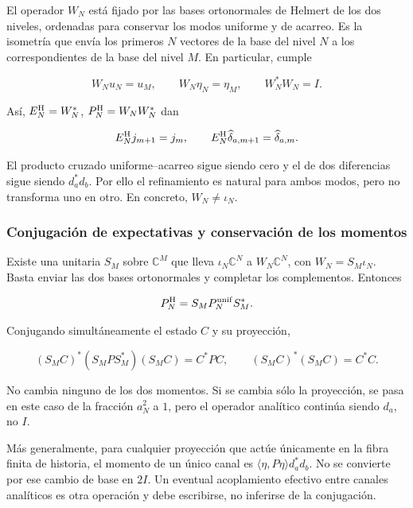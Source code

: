 El operador \(W_N\) está fijado por las bases ortonormales de Helmert
de los dos niveles, ordenadas para conservar los modos uniforme y de
acarreo. Es la isometría que envía los primeros \(N\) vectores de la
base del nivel \(N\) a los correspondientes de la base del nivel \(M\).
En particular, cumple

\begin{equation}
W_Nu_N=u_M,\qquad W_N\eta_N=\eta_M,\qquad W_N^*W_N=I.
\label{viii:gamma-add-display-12}
\end{equation}

Así, \(E_N^{\rm H}=W_N^*\), \(P_N^{\rm H}=W_NW_N^*\) dan

\begin{equation}
E_N^{\rm H}j_{m+1}=j_m,\qquad
E_N^{\rm H}\widehat\delta_{a,m+1}=\widehat\delta_{a,m}.
\label{viii:gamma-add-eq-5}
\end{equation}

El producto cruzado uniforme--acarreo sigue siendo cero y el de dos diferencias sigue siendo \(d_a^*d_b\). Por ello el refinamiento es natural para ambos modos, pero no transforma uno en otro. En concreto, \(W_N\ne\iota_N\).

\subsubsection{Conjugación de expectativas y conservación de los momentos}
\label{viii:gamma-add-sub-174}

Existe una unitaria \(S_M\) sobre \(\mathbb C^M\) que lleva \(\iota_N\mathbb C^N\) a \(W_N\mathbb C^N\), con \(W_N=S_M\iota_N\). Basta enviar las dos bases ortonormales y completar los complementos. Entonces

\begin{equation}
P_N^{\rm H}=S_MP_N^{\rm unif}S_M^*.
\label{viii:gamma-add-display-14}
\end{equation}

Conjugando simultáneamente el estado \(C\) y su proyección,

\begin{equation}
(S_MC)^*(S_MP S_M^*)(S_MC)=C^*PC,\qquad
(S_MC)^*(S_MC)=C^*C.
\label{viii:gamma-add-eq-6}
\end{equation}

No cambia ninguno de los dos momentos. Si se cambia sólo la proyección, se pasa en este caso de la fracción \(a_N^2\) a \(1\), pero el operador analítico continúa siendo \(d_a\), no \(I\).

Más generalmente, para cualquier proyección que actúe únicamente en la fibra finita de historia, el momento de un único canal es
\(\langle\eta,P\eta\rangle d_a^*d_b\). No se convierte por ese cambio de base en \(2I\). Un eventual acoplamiento efectivo entre canales analíticos es otra operación y debe escribirse, no inferirse de la conjugación.

